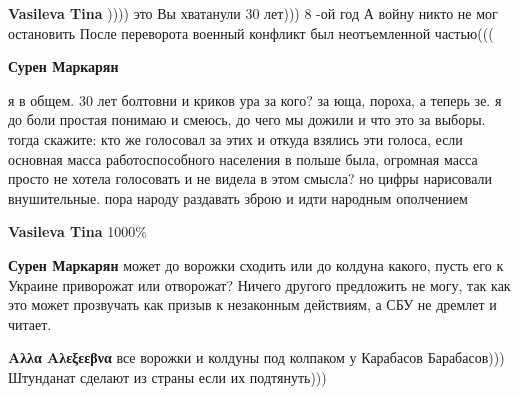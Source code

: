 \begin{itemize}
\begin{itemize}
\textbf{Vasileva Tina} )))) это Вы хватанули
30 лет)))
8 -ой год
А войну никто не мог остановить
После переворота военный конфликт был неотъемленной частью(((

 
\textbf{Сурен Маркарян} 

я в общем. 30 лет болтовни и криков ура за кого? за
юща, пороха, а теперь зе. я до боли простая понимаю и смеюсь, до чего мы дожили
и что это за выборы. тогда скажите: кто же голосовал за этих и откуда взялись
эти голоса, если основная масса работоспособного населения в польше была,
огромная масса просто не хотела голосовать и не видела в этом смысла? но цифры
нарисовали внушительные. пора народу раздавать зброю и идти народным ополчением

 
\textbf{Vasileva Tina} 1000\%

 
\textbf{Сурен Маркарян} может до ворожки сходить или до колдуна какого, пусть его к Украине приворожат или отворожат? Ничего другого предложить не могу, так как это может прозвучать как призыв к незаконным действиям, а СБУ не дремлет и читает.

 
\textbf{Αλλα Αλεξεεβνα} все ворожки и колдуны под колпаком у Карабасов Барабасов)))
Штунданат сделают из страны если их подтянуть)))

 

\end{itemize}
\end{itemize}
